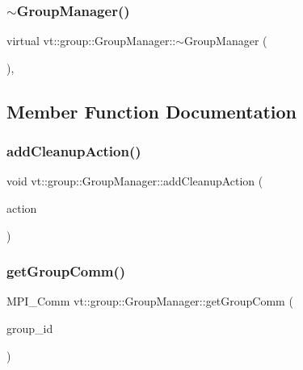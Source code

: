 \subsubsection{\texorpdfstring{$\sim$\+Group\+Manager()}{~GroupManager()}}
{\footnotesize\ttfamily virtual vt\+::group\+::\+Group\+Manager\+::$\sim$\+Group\+Manager (\begin{DoxyParamCaption}{ }\end{DoxyParamCaption})\hspace{0.3cm}{\ttfamily [inline]}, {\ttfamily [virtual]}}



\subsection{Member Function Documentation}
\mbox{\label{structvt_1_1group_1_1_group_manager_a79edddb814a77d2ff45fea14291e95df}} 
\subsubsection{\texorpdfstring{add\+Cleanup\+Action()}{addCleanupAction()}}
{\footnotesize\ttfamily void vt\+::group\+::\+Group\+Manager\+::add\+Cleanup\+Action (\begin{DoxyParamCaption}\item[{\hyperlink{namespacevt_ae0a5a7b18cc99d7b732cb4d44f46b0f3}{Action\+Type}}]{action }\end{DoxyParamCaption})}

\mbox{\label{structvt_1_1group_1_1_group_manager_aeb28b3e11f8901329a9a0c3bddd926f6}} 
\subsubsection{\texorpdfstring{get\+Group\+Comm()}{getGroupComm()}}
{\footnotesize\ttfamily M\+P\+I\+\_\+\+Comm vt\+::group\+::\+Group\+Manager\+::get\+Group\+Comm (\begin{DoxyParamCaption}\item[{\hyperlink{namespacevt_a27b5e4411c9b6140c49100e050e2f743}{Group\+Type} const \&}]{group\+\_\+id }\end{DoxyParamCaption})}

